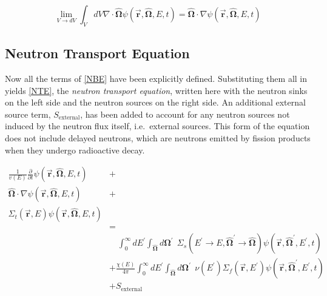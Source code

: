 \begin{equation}
\label{streaming}
 \lim_{V\to dV} \int_V dV \nabla \cdot \boldsymbol{\hat{\Omega}}  \psi(\boldsymbol{\vec{r}},\boldsymbol{\hat{\Omega}},E,t) =  \boldsymbol{\hat{\Omega}}  \cdot \nabla\psi(\boldsymbol{\vec{r}},\boldsymbol{\hat{\Omega}},E,t) 
 \end{equation}
 

\subsection{Neutron Transport Equation}

Now all the terms of \eqref{NBE} have been explicitly defined.  Substituting them all in yields \eqref{NTE}, the \emph{neutron transport equation}, written here with the neutron sinks on the left side and the neutron sources on the right side.  An additional external source term, $S_{\mathrm{external}}$, has been added to account for any neutron sources not induced by the neutron flux itself, i.e.\ external sources.  This form of the equation does not include delayed neutrons, which are neutrons emitted by fission products when they undergo radioactive decay.

\begin{equation}
\label{NTE}
\begin{split}
\frac{1}{v(E)} \frac{\partial }{\partial t}\psi(\boldsymbol{\vec{r}},\boldsymbol{\hat{\Omega}},E,t) &+  \\
\boldsymbol{\hat{\Omega}}  \cdot \nabla \psi(\boldsymbol{\vec{r}},\boldsymbol{\hat{\Omega}},E,t) &+ \\
\Sigma_t(\boldsymbol{\vec{r}},E) \psi(\boldsymbol{\vec{r}},\boldsymbol{\hat{\Omega}},E,t) & \\
& =  \\
& \quad \int_0^\infty dE^\prime \int_{\boldsymbol{\hat{\Omega}}} d\boldsymbol{\Omega}^\prime \:\: \Sigma_s(E^\prime \rightarrow E,\boldsymbol{\hat{\Omega}}^\prime \rightarrow \boldsymbol{\hat{\Omega}}) \psi(\boldsymbol{\vec{r}},\boldsymbol{\hat{\Omega}}^\prime,E^\prime,t)    \\
&+ \frac{\chi(E)}{4\pi} \int_0^\infty dE^\prime  \int_{\boldsymbol{\hat{\Omega}}} d\boldsymbol{\Omega}^\prime \:\:  \nu(E^\prime) \Sigma_f(\boldsymbol{\vec{r}},E^\prime) \psi(\boldsymbol{\vec{r}},\boldsymbol{\hat{\Omega}}^\prime,E^\prime,t)  \\
& + S_{\mathrm{external}}
\end{split}
 \end{equation}
 
